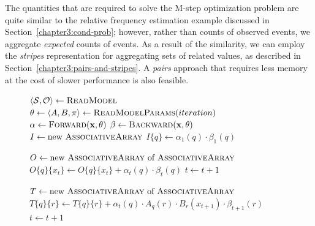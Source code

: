 The quantities that are required to solve the M-step optimization
problem are quite similar to the relative frequency estimation example
discussed in Section~\ref{chapter3:cond-prob}; however, rather than
counts of observed events, we aggregate \emph{expected} counts of
events.  As a result of the similarity, we can employ the \emph{
  stripes} representation for aggregating sets of related values, as
described in Section~\ref{chapter3:pairs-and-stripes}.  A \emph{pairs}
approach that requires less memory at the cost of slower performance
is also feasible.

\begin{figure}[t]
\algrenewcommand{}
\algrenewcommand{}
  \begin{algorithmic}[1]
    \State $\langle \mathcal{S}, \mathcal{O} \rangle \gets \textsc{ReadModel}$
    \State $\theta \gets \langle A , B , \pi \rangle \gets \textsc{ReadModelParams}(iteration)$
    \EndProcedure
        \State $\alpha \gets \textsc{Forward}(\textbf{x},\theta)$ 
        \State $\beta \gets \textsc{Backward}(\textbf{x},\theta)$ 
        \State $I \gets \textrm{new }\textsc{AssociativeArray}$ 
           
          \State $I\{q\} \gets \alpha_1(q) \cdot \beta_1(q)$
        \EndFor
        
        \State $O \gets \textrm{new }\textsc{AssociativeArray}\textrm{ of }\textsc{AssociativeArray}$ 
          
           
           \State $O\{q\}\{x_t\} \gets O\{q\}\{x_t\} + \alpha_t(q) \cdot \beta_t(q)$
        \EndFor
           \State $t \leftarrow t + 1$
        \EndFor

        \State $T \gets \textrm{new }\textsc{AssociativeArray}\textrm{ of }\textsc{AssociativeArray}$
        \State {}
          
           
           
           \State $T\{q\}\{r\} \gets T\{q\}\{r\} + \alpha_t(q) \cdot A_q(r) \cdot B_r(x_{t+1}) \cdot \beta_{t+1}(r)$
        \EndFor
        \EndFor
        \State $t \leftarrow t + 1$
        \EndFor


\end{algorithmic}
\end{figure}
